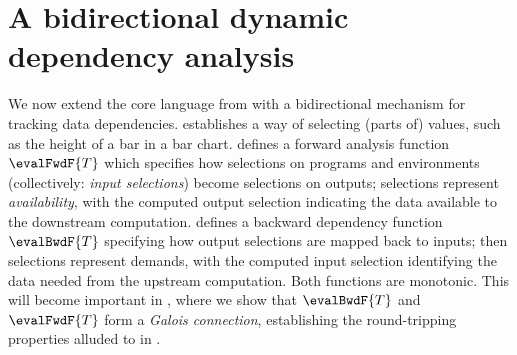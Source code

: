 \section{A bidirectional dynamic dependency analysis}
\label{sec:data-dependencies}

We now extend the core language from  with a bidirectional mechanism for tracking data dependencies.  establishes a way of selecting (parts of) values, such as the height of a bar in a bar chart.  defines a forward analysis function $\evalFwdF{T}$ which specifies how selections on programs and environments (collectively: \emph{input selections}) become selections on outputs; selections represent \emph{availability}, with the computed output selection indicating the data available to the downstream computation.  defines a backward dependency function $\evalBwdF{T}$ specifying how output selections are mapped back to inputs; then selections represent demands, with the computed input selection identifying the data needed from the upstream computation. Both functions are monotonic. This will become important in , where we show that $\evalBwdF{T}$ and $\evalFwdF{T}$ form a \emph{Galois connection}, establishing the round-tripping properties alluded to in .



